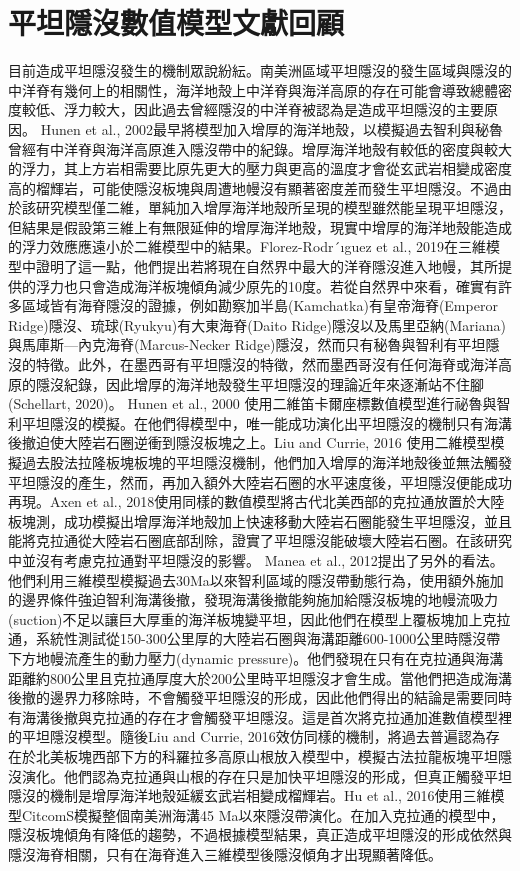 \section{平坦隱沒數值模型文獻回顧}

目前造成平坦隱沒發生的機制眾說紛紜。南美洲區域平坦隱沒的發生區域與隱沒的中洋脊有幾何上的相關性，海洋地殼上中洋脊與海洋高原的存在可能會導致總體密度較低、浮力較大，因此過去曾經隱沒的中洋脊被認為是造成平坦隱沒的主要原因。
Hunen et al., 2002最早將模型加入增厚的海洋地殼，以模擬過去智利與秘魯曾經有中洋脊與海洋高原進入隱沒帶中的紀錄。增厚海洋地殼有較低的密度與較大的浮力，其上方岩相需要比原先更大的壓力與更高的溫度才會從玄武岩相變成密度高的榴輝岩，可能使隱沒板塊與周遭地幔沒有顯著密度差而發生平坦隱沒。不過由於該研究模型僅二維，單純加入增厚海洋地殼所呈現的模型雖然能呈現平坦隱沒，但結果是假設第三維上有無限延伸的增厚海洋地殼，現實中增厚的海洋地殼能造成的浮力效應應遠小於二維模型中的結果。Florez-Rodr´ıguez et al., 2019在三維模型中證明了這一點，他們提出若將現在自然界中最大的洋脊隱沒進入地幔，其所提供的浮力也只會造成海洋板塊傾角減少原先的10度。若從自然界中來看，確實有許多區域皆有海脊隱沒的證據，例如勘察加半島(Kamchatka)有皇帝海脊(Emperor Ridge)隱沒、琉球(Ryukyu)有大東海脊(Daito Ridge)隱沒以及馬里亞納(Mariana)與馬庫斯—內克海脊(Marcus-Necker Ridge)隱沒，然而只有秘魯與智利有平坦隱沒的特徵。此外，在墨西哥有平坦隱沒的特徵，然而墨西哥沒有任何海脊或海洋高原的隱沒紀錄，因此增厚的海洋地殼發生平坦隱沒的理論近年來逐漸站不住腳(Schellart, 2020)。
Hunen et al., 2000 使用二維笛卡爾座標數值模型進行祕魯與智利平坦隱沒的模擬。在他們得模型中，唯一能成功演化出平坦隱沒的機制只有海溝後撤迫使大陸岩石圈逆衝到隱沒板塊之上。Liu and Currie, 2016 使用二維模型模擬過去股法拉隆板塊板塊的平坦隱沒機制，他們加入增厚的海洋地殼後並無法觸發平坦隱沒的產生，然而，再加入額外大陸岩石圈的水平速度後，平坦隱沒便能成功再現。Axen et al., 2018使用同樣的數值模型將古代北美西部的克拉通放置於大陸板塊測，成功模擬出增厚海洋地殼加上快速移動大陸岩石圈能發生平坦隱沒，並且能將克拉通從大陸岩石圈底部刮除，證實了平坦隱沒能破壞大陸岩石圈。在該研究中並沒有考慮克拉通對平坦隱沒的影響。
Manea et al., 2012提出了另外的看法。他們利用三維模型模擬過去30Ma以來智利區域的隱沒帶動態行為，使用額外施加的邊界條件強迫智利海溝後撤，發現海溝後撤能夠施加給隱沒板塊的地幔流吸力(suction)不足以讓巨大厚重的海洋板塊變平坦，因此他們在模型上覆板塊加上克拉通，系統性測試從150-300公里厚的大陸岩石圈與海溝距離600-1000公里時隱沒帶下方地幔流產生的動力壓力(dynamic pressure)。他們發現在只有在克拉通與海溝距離約800公里且克拉通厚度大於200公里時平坦隱沒才會生成。當他們把造成海溝後撤的邊界力移除時，不會觸發平坦隱沒的形成，因此他們得出的結論是需要同時有海溝後撤與克拉通的存在才會觸發平坦隱沒。這是首次將克拉通加進數值模型裡的平坦隱沒模型。隨後Liu and Currie, 2016效仿同樣的機制，將過去普遍認為存在於北美板塊西部下方的科羅拉多高原山根放入模型中，模擬古法拉龍板塊平坦隱沒演化。他們認為克拉通與山根的存在只是加快平坦隱沒的形成，但真正觸發平坦隱沒的機制是增厚海洋地殼延緩玄武岩相變成榴輝岩。Hu et al., 2016使用三維模型CitcomS模擬整個南美洲海溝45 Ma以來隱沒帶演化。在加入克拉通的模型中，隱沒板塊傾角有降低的趨勢，不過根據模型結果，真正造成平坦隱沒的形成依然與隱沒海脊相關，只有在海脊進入三維模型後隱沒傾角才出現顯著降低。
